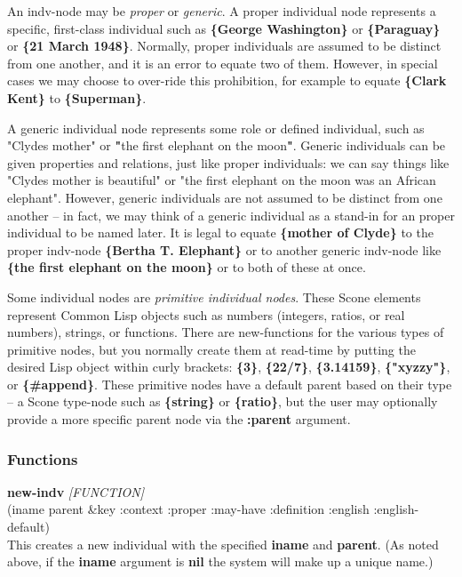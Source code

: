 \documentclass[titlepage,twoside,openright,11pt]{article}
\begin{document}
An indv-node may be \emph{proper} or \emph{generic}. A proper individual
node represents a specific, first-class individual such as
\textbf{\{George Washington\}} or \textbf{\{Paraguay\}} or \textbf{\{21
March 1948\}}. Normally, proper individuals are assumed to be distinct
from one another, and it is an error to equate two of them. However, in
special cases we may choose to over-ride this prohibition, for example
to equate \textbf{\{Clark Kent\}} to \textbf{\{Superman\}}.

A generic individual node represents some role or defined individual,
such as "Clyde\textquotesingle s mother" or \textbf{"}the first elephant
on the moon\textbf{"}. Generic individuals can be given properties and
relations, just like proper individuals: we can say things like
"Clyde\textquotesingle s mother is beautiful" or "the first elephant on
the moon was an African elephant". However, generic individuals are not
assumed to be distinct from one another -- in fact, we may think of a
generic individual as a stand-in for an proper individual to be named
later. It is legal to equate \textbf{\{mother of Clyde\}} to the proper
indv-node \textbf{\{Bertha T. Elephant\}} or to another generic
indv-node like \textbf{\{the first elephant on the moon\}} or to both of
these at once.

Some individual nodes are \emph{primitive individual nodes}. These Scone
elements represent Common Lisp objects such as numbers (integers,
ratios, or real numbers), strings, or functions. There are new-functions
for the various types of primitive nodes, but you normally create them
at read-time by putting the desired Lisp object within curly brackets:
\textbf{\{3\}}, \textbf{\{22/7\}}, \textbf{\{3.14159\}},
\textbf{\{"xyzzy"\}}, or \textbf{\{\#\textquotesingle append\}}. These
primitive nodes have a default parent based on their type -- a Scone
type-node such as \textbf{\{string\}} or \textbf{\{ratio\}}, but the
user may optionally provide a more specific parent node via the
\textbf{:parent} argument.

\subsubsection{Functions}\label{functions-1}

\textbf{new-indv} \emph{{[}FUNCTION{]}\\
}(iname parent \&key :context :proper :may-have :definition :english
:english-default)\\
This creates a new individual with the specified \textbf{iname} and
\textbf{parent}. (As noted above, if the \textbf{iname} argument is
\textbf{nil} the system will make up a unique name.)
\end{document}
